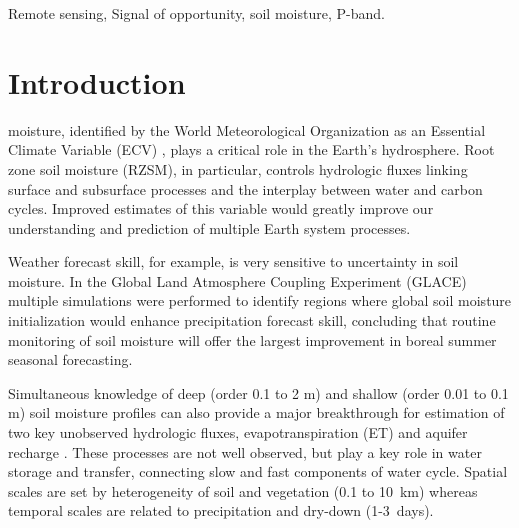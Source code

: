 \documentclass[draftcls,onecolumn]{IEEEtran}  %
\begin{document}
\begin{IEEEkeywords}
Remote sensing, Signal of opportunity, soil moisture, P-band.
\end{IEEEkeywords}


%
\IEEEpeerreviewmaketitle

\section{Introduction}
% 
% 
% 
% 
 moisture, identified by the World Meteorological Organization as an Essential Climate Variable (ECV) \cite{WMO2011}, 
plays a critical role in the Earth's hydrosphere.
Root zone soil moisture (RZSM), in particular, controls hydrologic fluxes linking surface and subsurface processes and the interplay between  water and carbon cycles.  Improved estimates of this variable would greatly improve our understanding and prediction of multiple Earth system processes. 

Weather forecast skill, for example, is very sensitive to uncertainty in soil moisture. 
In the Global Land Atmosphere Coupling Experiment (GLACE)  \cite{Glace1995} multiple simulations were performed to identify regions where global soil moisture initialization would enhance precipitation forecast skill, 
concluding that routine monitoring of soil moisture will offer the largest improvement in boreal summer seasonal forecasting.  

Simultaneous knowledge of deep (order 0.1 to 2 m) and shallow (order 0.01 to 0.1 m) soil moisture profiles can also provide a major breakthrough for estimation of two key unobserved hydrologic fluxes, evapotranspiration (ET) and aquifer recharge \cite{Entekhabi2006}.  
These processes are not well observed, but play a key role in water storage and transfer, connecting slow and fast components of water cycle. 
Spatial scales are set by heterogeneity of soil and vegetation (0.1 to 10~km) whereas temporal scales are related to precipitation and dry-down (1-3~days). 
\end{document}
